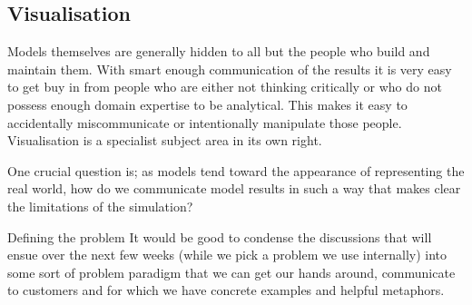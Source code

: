 \subsection{Visualisation} 

Models themselves are generally hidden to all but the people who
build and maintain them. With smart enough communication of the results it is
very easy to get buy in from people who are either not thinking critically or
who do not possess enough domain expertise to be analytical. This makes it easy
to accidentally miscommunicate or intentionally manipulate those people.
Visualisation is a specialist subject area in its own right.

One crucial question is; as models tend toward the appearance of representing
the real world, how do we communicate model results in such a way that makes
clear the limitations of the simulation?

Defining the problem It would be good to condense the discussions that will
ensue over the next few weeks (while we pick a problem we use internally) into
some sort of problem paradigm that we can get our hands around, communicate to
customers and for which we have concrete examples and helpful metaphors.


